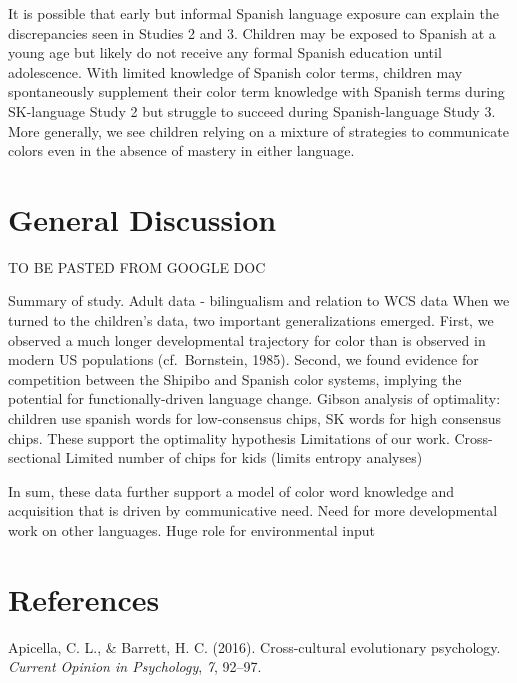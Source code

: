 \documentclass[
  english,
  ,man,floatsintext]{apa6}
\begin{document}
It is possible that early but informal Spanish language exposure can explain the discrepancies seen in Studies 2 and 3. Children may be exposed to Spanish at a young age but likely do not receive any formal Spanish education until adolescence. With limited knowledge of Spanish color terms, children may spontaneously supplement their color term knowledge with Spanish terms during SK-language Study 2 but struggle to succeed during Spanish-language Study 3. More generally, we see children relying on a mixture of strategies to communicate colors even in the absence of mastery in either language.

\hypertarget{general-discussion}{%
\section{General Discussion}\label{general-discussion}}

TO BE PASTED FROM GOOGLE DOC

Summary of study.
Adult data - bilingualism and relation to WCS data
When we turned to the children's data, two important generalizations emerged. First, we observed a much longer developmental trajectory for color than is observed in modern US populations (cf.~Bornstein, 1985).
Second, we found evidence for competition between the Shipibo and Spanish color systems, implying the potential for functionally-driven language change.
Gibson analysis of optimality: children use spanish words for low-consensus chips, SK words for high consensus chips. These support the optimality hypothesis
Limitations of our work.
Cross-sectional
Limited number of chips for kids (limits entropy analyses)

In sum, these data further support a model of color word knowledge and acquisition that is driven by communicative need.
Need for more developmental work on other languages.
Huge role for environmental input

\newpage

\hypertarget{references}{%
\section{References}\label{references}}

\begingroup
\setlength{\parindent}{-0.5in}
\setlength{\leftskip}{0.5in}

\hypertarget{refs}{}
\leavevmode\hypertarget{ref-apicella2016}{}%
Apicella, C. L., \& Barrett, H. C. (2016). Cross-cultural evolutionary psychology. \emph{Current Opinion in Psychology}, \emph{7}, 92--97.
\end{document}
